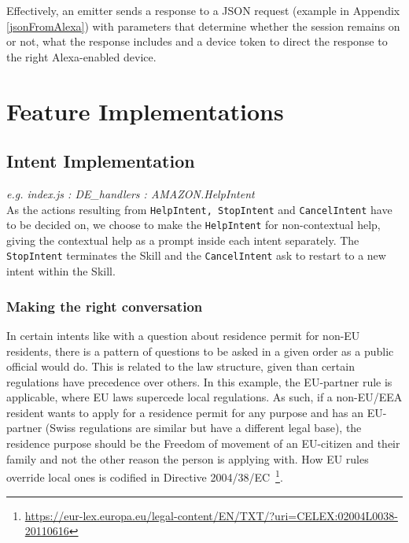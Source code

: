 Effectively, an emitter sends a response to a JSON request (example in Appendix \ref{jsonFromAlexa}) with parameters that determine whether the session remains on or not, what the response includes and a device token to direct the response to the right Alexa-enabled device.



















\section[Features]{Feature Implementations}



\subsection*{Intent Implementation}
\textit{e.g. index.js \quad : \quad  DE\_handlers \quad :  \quad AMAZON.HelpIntent}\\
As the actions resulting from \texttt{HelpIntent, StopIntent} and \texttt{CancelIntent}
have to be decided on, we choose to make the \texttt{HelpIntent} for non-contextual help, giving the contextual help as a prompt inside each intent separately.
The \texttt{StopIntent} terminates the Skill and the \texttt{CancelIntent} ask to restart to a new intent within the Skill.


\subsubsection*{Making the right conversation}
In certain intents like with a question about residence permit for non-EU residents, there is a pattern of questions to be asked in a given order as a public official would do. This is related to the law structure, given than certain regulations have precedence over others. In this example, the EU-partner rule is applicable, where EU laws supercede local regulations.
As such, if a non-EU/EEA resident wants to apply for a residence permit for any purpose and has an EU-partner (Swiss regulations are similar but have a different legal base), the residence purpose should be the Freedom of movement of an EU-citizen and their family and not the other reason the person is applying with.
How EU rules override local ones is codified in 
Directive 2004/38/EC~\footnote{
\url{https://eur-lex.europa.eu/legal-content/EN/TXT/?uri=CELEX:02004L0038-20110616}}.



